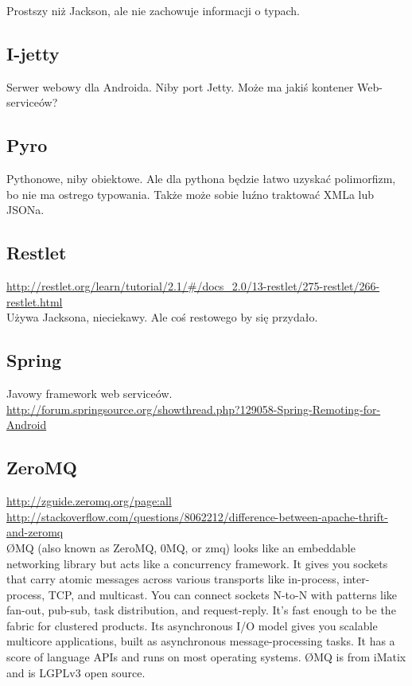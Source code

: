 Prostszy niż Jackson, ale nie zachowuje informacji o typach. 


\subsection{I-jetty}
Serwer webowy dla Androida. Niby port Jetty. Może ma jakiś kontener Web-serviceów?


\subsection{Pyro}
Pythonowe, niby obiektowe. Ale dla pythona będzie łatwo uzyskać polimorfizm, bo nie ma ostrego typowania. Także może sobie luźno traktować XMLa lub JSONa.


\subsection{Restlet}
\url{http://restlet.org/learn/tutorial/2.1/#/docs_2.0/13-restlet/275-restlet/266-restlet.html}\\
Używa Jacksona, nieciekawy. Ale coś restowego by się przydało.


\subsection{Spring}
Javowy framework web serviceów.
\url{http://forum.springsource.org/showthread.php?129058-Spring-Remoting-for-Android}\\


\subsection{ZeroMQ}
\url{http://zguide.zeromq.org/page:all}
\url{http://stackoverflow.com/questions/8062212/difference-between-apache-thrift-and-zeromq}\\
ØMQ (also known as ZeroMQ, 0MQ, or zmq) looks like an embeddable networking library but acts like a concurrency framework. It gives you sockets that carry atomic messages across various transports like in-process, inter-process, TCP, and multicast. You can connect sockets N-to-N with patterns like fan-out, pub-sub, task distribution, and request-reply. It's fast enough to be the fabric for clustered products. Its asynchronous I/O model gives you scalable multicore applications, built as asynchronous message-processing tasks. It has a score of language APIs and runs on most operating systems. ØMQ is from iMatix and is LGPLv3 open source.




